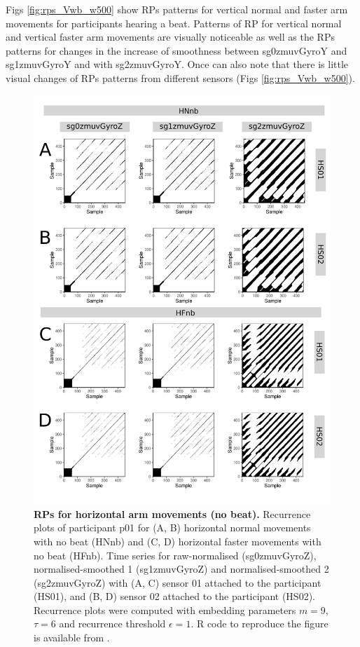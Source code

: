 Figs \ref{fig:rps_Vwb_w500} show RPs patterns for vertical normal and 
faster arm movements for participants hearing a beat. 
Patterns of RP for vertical normal and vertical faster arm movements are 
visually noticeable as well as the RPs patterns for changes in 
the increase of smoothness between sg0zmuvGyroY and sg1zmuvGyroY and 
with sg2zmuvGyroY. Once can also note that there is little visual 
changes of RPs patterns from different sensors (Figs \ref{fig:rps_Vwb_w500}).


\begin{figure}[!h]
\centering
\includegraphics[height=0.8\textheight]{rps_Hnb_w500}
\caption{
	{\bf RPs for horizontal arm movements (no beat).}	
	Recurrence plots of participant p01 for 
	(A, B) horizontal normal movements with no beat (HNnb) and
	(C, D) horizontal faster movements with no beat (HFnb).
	Time series for raw-normalised (sg0zmuvGyroZ), 
	normalised-smoothed 1 (sg1zmuvGyroZ) and 
	normalised-smoothed 2 (sg2zmuvGyroZ) with
	(A, C) sensor 01 attached to the participant (HS01), and
	(B, D) sensor 02 attached to the participant (HS02).
	Recurrence plots were computed with 
	embedding parameters $m=9$, $\tau=6$ and 
	recurrence threshold $\epsilon=1$.
	R code to reproduce the figure is available from \cite{hwum2018}.
        }
    \label{fig:rps_Hnb_w500}
\end{figure}

